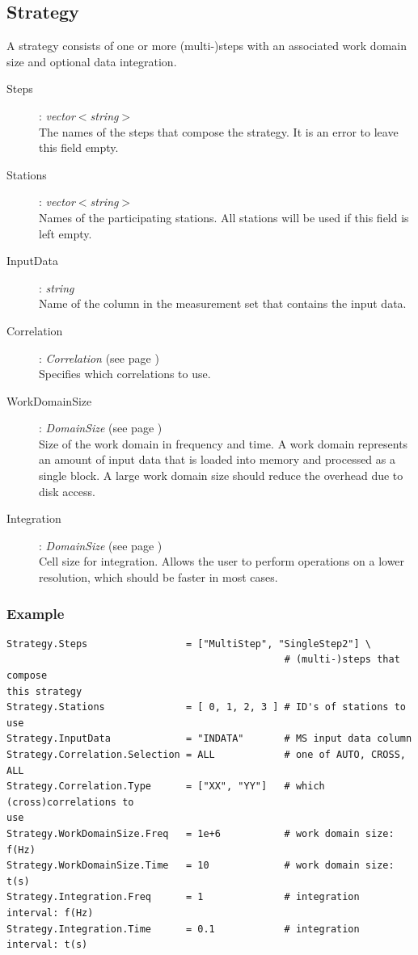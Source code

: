 \documentclass[10pt]{lofar}
\begin{document}
\subsection*{Strategy}
A strategy consists of one or more (multi-)steps with an associated work domain
size and optional data integration.
\begin{description}
\item [Steps] : \emph{vector$<$string$>$} \\
    The names of the steps that compose the strategy. It is an error to leave
this field empty.
\item [Stations] : \emph{vector$<$string$>$} \\
    Names of the participating stations. All stations will be used if this field
is left empty.
\item [InputData] : \emph{string} \\
    Name of the column in the measurement set that contains the input data.
\item [Correlation] : \emph{Correlation} (see page \pageref{app-correlation}) \\
    Specifies which correlations to use.
\item [WorkDomainSize] : \emph{DomainSize} (see page \pageref{app-domainsize})
\\
    Size of the work domain in frequency and time. A work domain represents an
amount of input data that is loaded into memory and processed as a single block.
A large work domain size should reduce the overhead due to disk access.
\item [Integration] : \emph{DomainSize} (see page \pageref{app-domainsize}) \\
    Cell size for integration. Allows the user to perform operations on a lower
resolution, which should be faster in most cases.
\end{description}

\subsubsection*{Example}
{\footnotesize
\begin{verbatim}
Strategy.Steps                 = ["MultiStep", "SingleStep2"] \
                                                # (multi-)steps that compose
this strategy
Strategy.Stations              = [ 0, 1, 2, 3 ] # ID's of stations to use
Strategy.InputData             = "INDATA"       # MS input data column
Strategy.Correlation.Selection = ALL            # one of AUTO, CROSS, ALL
Strategy.Correlation.Type      = ["XX", "YY"]   # which (cross)correlations to
use
Strategy.WorkDomainSize.Freq   = 1e+6           # work domain size: f(Hz)
Strategy.WorkDomainSize.Time   = 10             # work domain size: t(s)
Strategy.Integration.Freq      = 1              # integration interval: f(Hz)
Strategy.Integration.Time      = 0.1            # integration interval: t(s)
\end{verbatim}
}
\end{document}
